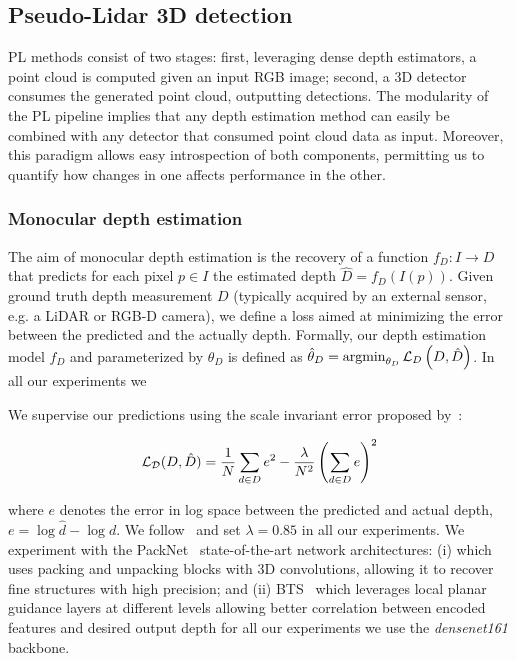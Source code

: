 \subsection{Pseudo-Lidar 3D detection}
\label{subsec:pseudo-lidar}
PL methods consist of two stages: first, leveraging dense depth estimators, a point cloud is computed given an input RGB image; second, a 3D detector consumes the generated point cloud, outputting detections. The modularity of the PL pipeline implies that any depth estimation method can easily be combined with any detector that consumed point cloud data as input. Moreover, this paradigm allows easy introspection of both components, permitting us to quantify how changes in one affects performance in the other. 

\subsubsection{Monocular depth estimation}
\label{subsubsec:monodepth}

The aim of monocular depth estimation is the recovery of a function $f_D: I \to D$ that predicts for each pixel $p \in I$ the estimated depth $\hat{D} = f_D\left( I\left(p\right)\right)$. Given ground truth depth measurement $D$ (typically acquired by an external sensor, e.g. a LiDAR or RGB-D camera), we define a loss aimed at minimizing the error between the predicted and the actually depth. Formally, our depth estimation model $f_D$ and parameterized by $\theta_D$ is defined as $\hat{\theta}_D = \operatorname*{argmin}_{\theta_D}\mathcal{L}_{D}\left(D,\hat{D}\right)$. In all our experiments we 

% 


We supervise our predictions using the scale invariant error proposed by~\cite{eigen2014depth}:  

\begin{equation} \label{eq:silog_loss}
\small
\mathcal{L_D}(D, \hat{D}) =
\frac{1}{N} \sum_{d \in D} e ^2 - \frac{\lambda}{N^2} \left(\sum_{d \in D} e \right)^2
\end{equation}

\noindent where $e$ denotes the error in log space between the predicted and actual depth, $e = \log \hat{d} - \log d$. We follow~\cite{lee2019big} and set $\lambda=0.85$ in all our experiments. We experiment with the PackNet~\cite{guizilini20203d} state-of-the-art network architectures: (i) which uses packing and unpacking blocks with 3D convolutions, allowing it to recover fine structures with high precision; and (ii) BTS~\cite{lee2019big} which leverages local planar guidance layers at different levels allowing better correlation between encoded features and desired output depth  for all our experiments we use the \textit{densenet161} backbone.

